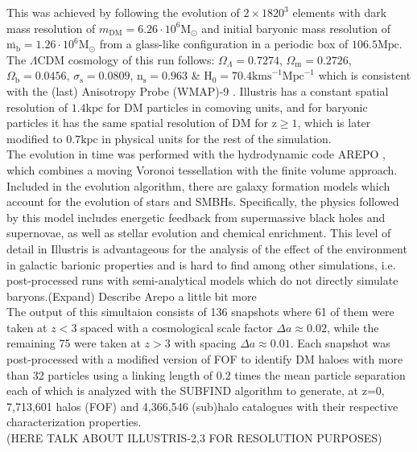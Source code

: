 \documentclass[a4paper,fleqn,usenatbib]{mnras}
\begin{document}
This was achieved by following the evolution of $2 \times 1820^3$ elements with dark mass resolution of $m_{\text{DM}} = 6.26\cdot 10^6\text{M}_{\odot}$ and initial baryonic mass resolution of $\overline{\text{m}_\text{b}}=1.26\cdot 10^6\text{M}_{\odot}$ from a glass-like configuration in a periodic box of $106.5\text{Mpc}$. The $\Lambda \text{CDM}$ cosmology of this run follows: $\Omega_\Lambda=0.7274$, $\Omega_\text{m}=0.2726$, $\Omega_\text{b}=0.0456$, $\sigma_\text{s}=0.0809$, $\text{n}_\text{s}=0.963$ \& $\text{H}_0=70.4\text{kms}
^{-1}\text{Mpc}^{-1}$ which is consistent with the (last) Anisotropy Probe (WMAP)-9 \cite{AnisotropyProbe}. Illustris has a constant spatial resolution of $1.4\text{kpc}$ for DM particles in comoving units, and for baryonic particles it has the same spatial resolution of DM for $\text{z}\geq 1$, which is later modified to $0.7\text{kpc}$ in physical units for the rest of the simulation. \\

The evolution in time was performed with the hydrodynamic code AREPO \cite{arepo}, which combines a moving Voronoi tessellation with the finite volume approach. Included in the evolution algorithm, there are galaxy formation models which account for the evolution of stars and SMBHs. Specifically, the physics followed by this model includes energetic feedback from supermassive black holes and supernovae, as well as stellar evolution and chemical enrichment. This level of detail in Illustris is advantageous for the analysis of the effect of the environment  in galactic barionic properties and is hard to find among other simulations, i.e. post-processed runs with semi-analytical models which do not directly simulate baryons.(Expand) Describe Arepo a little bit more\\

The output of this simultaion consists of 136 snapshots where 61 of them were taken at $z < 3$ spaced with a cosmological scale factor $\Delta a \approx 0.02$, while the remaining 75 were taken at $z > 3$ with spacing $\Delta a \approx 0.01$. Each snapshot was post-processed with a modified version of FOF \cite{FOF} to identify DM haloes with more than 32 particles using a linking length of 0.2 times the mean particle separation each of which is analyzed with the SUBFIND algorithm \cite{subfind} to generate, at z=0, 7,713,601 halos (FOF) and 4,366,546 (sub)halo catalogues with their respective characterization properties. \\

(HERE TALK ABOUT ILLUSTRIS-2,3 FOR RESOLUTION PURPOSES)
\end{document}
